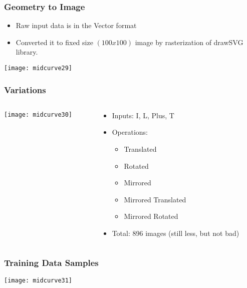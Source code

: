 \begin{frame}[fragile]\frametitle{Geometry to Image}
	\begin{itemize}
	\item Raw input data is in the Vector format
	\item Converted it to fixed size $(100x100)$ image by rasterization of drawSVG library.
	\end{itemize}
\begin{center}
\texttt{[image: midcurve29]}
\end{center}	
\end{frame}

\begin{frame}[fragile]\frametitle{Variations}

  \begin{columns}[t]
    \begin{column}[T]{0.4\linewidth}
      \centering
      \texttt{[image: midcurve30]}
    \end{column}
    \begin{column}[T]{0.6\linewidth}
	\begin{itemize}
	\item Inputs: I, L, Plus, T
	\item Operations:
	\begin{itemize}
		\item Translated
		\item Rotated
		\item Mirrored
		\item Mirrored Translated
		\item Mirrored Rotated
	\end{itemize}
	\item Total: 896 images (still less, but not bad)
	\end{itemize}
    \end{column}
  \end{columns}
  \end{frame}
  
\begin{frame}[fragile]\frametitle{Training Data Samples}

\begin{center}
\texttt{[image: midcurve31]}
\end{center}	
\end{frame}

